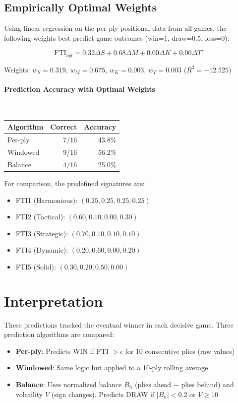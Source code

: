 \documentclass[11pt]{book}
\begin{document}
\subsection{Empirically Optimal Weights}

Using linear regression on the per-ply positional data from all games, the following weights best predict game outcomes (win=1, draw=0.5, loss=0):

\begin{equation}
\text{FTI}_{opt} = 0.32 \Delta S + 0.68 \Delta M + 0.00 \Delta K + 0.00 \Delta T'
\end{equation}

Weights: $w_S = 0.319$, $w_M = 0.675$, $w_K = 0.003$, $w_T = 0.003$ ($R^2 = -12.525$)

\paragraph{Prediction Accuracy with Optimal Weights}\ \\

\begin{tabular}{lrr}
\toprule
\textbf{Algorithm} & \textbf{Correct} & \textbf{Accuracy} \\
\midrule
Per-ply & 7/16 & 43.8\% \\
Windowed & 9/16 & 56.2\% \\
Balance & 4/16 & 25.0\% \\
\bottomrule
\end{tabular}

For comparison, the predefined signatures are:
\begin{itemize}
\item FTI1 (Harmonious): $(0.25, 0.25, 0.25, 0.25)$
\item FTI2 (Tactical): $(0.60, 0.10, 0.00, 0.30)$
\item FTI3 (Strategic): $(0.70, 0.10, 0.10, 0.10)$
\item FTI4 (Dynamic): $(0.20, 0.60, 0.00, 0.20)$
\item FTI5 (Solid): $(0.30, 0.20, 0.50, 0.00)$
\end{itemize}


\section{Interpretation}

These predictions tracked the eventual winner in each decisive game. 
Three prediction algorithms are compared:
\begin{itemize}
\item \textbf{Per-ply}: Predicts WIN if FTI $> \epsilon$ for 10 consecutive plies (raw values)
\item \textbf{Windowed}: Same logic but applied to a 10-ply rolling average
\item \textbf{Balance}: Uses normalized balance $B_n$ (plies ahead $-$ plies behind) and volatility $V$ (sign changes). Predicts DRAW if $|B_n| < 0.2$ or $V \ge 10$
\end{itemize}
\end{document}
